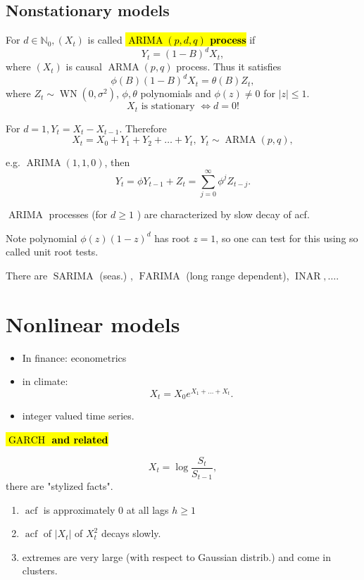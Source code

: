 \documentclass[12pt,a4paper, notitlepage]{book}
\newcommand{\hlc}[2][yellow]{ {\sethlcolor{#1} \hl{#2}} }
\newcommand{\hlcr}[1]{\hlc[lightred]{#1}}
\theoremstyle{definition} %
\theoremstyle{plain} %
\newcommand{\N}{\mathbb N}
\DeclareMathOperator{\Acf}{acf}
\DeclareMathOperator{\Wn}{WN}
\DeclareMathOperator{\Arma}{ARMA}
\DeclareMathOperator{\Inar}{INAR}
\DeclareMathOperator{\Arima}{ARIMA}
\DeclareMathOperator{\Farima}{FARIMA}
\DeclareMathOperator{\Sarima}{SARIMA}
\DeclareMathOperator{\Garch}{GARCH}
\newcommand{\New}[1]{ {\bf \hlcr{#1} } }
\begin{document}
 
\section{ Nonstationary models}

For $ d \in \N _0 , (X_t) $ is called  \New{$ \Arima(p,d, q) $ process} if 
\[ Y_t = (1-B)^{d} X_t , \]
where $ (X_t) $ is causal $ \Arma(p,q) $ process.
Thus it satisfies
\[ \phi(B) (1- B)^d X_t = \theta(B) Z_t , \]
where $ Z_t \sim \Wn(0,  \sigma^2) $, $ \phi, \theta $ polynomials and $ \phi (z) \neq 0 $ for 
$ |z| \leq 1 $.
\[ X_t  \text{ is stationary } \iff d = 0! \]

For $ d=1 , Y_t = X_t - X_{t-1} $.
Therefore 
\[ X_t = X_0 + Y_1 + Y_2 + \ldots + Y_t ,  \; Y_t \sim \Arma(p,q)  , \]

e.g. $ \Arima(1,1, 0) $, then 
\[ Y_t = \phi Y_{t-1} + Z_t = \sum _{j=0}^{\infty} \phi ^j Z_{t-j} . \]

$ \Arima $ processes (for $ d \geq 1 $ ) are characterized by slow
decay of acf.

Note polynomial $ \phi(z) (1- z)^d $ has root $ z= 1 $, so one can
test for this using so called unit root tests.

There are $ \Sarima $ (seas.) , $ \Farima $ (long range dependent),
$ \Inar, \ldots $.


\chapter{Nonlinear models}

\begin{itemize}
\item In finance: econometrics
\item in climate: 
\[ X_t = X_0 e^{X_1 + \ldots + X_t } . \]
\item integer valued time series.
\end{itemize}

\New{ $ \Garch $ and related }

\[ X_t = \log \frac{S_t}{S_{t-1}} , \]
there are "stylized facts".
\begin{enumerate}
\item $ \Acf $ is approximately $ 0 $ at all lags $ h \geq 1 $
\item $ \Acf $ of $ |X_t | $ of $ X_t ^2 $ decays slowly.
\item extremes are very large (with respect to Gaussian distrib.) and come in clusters.
\end{enumerate}
\end{document}
